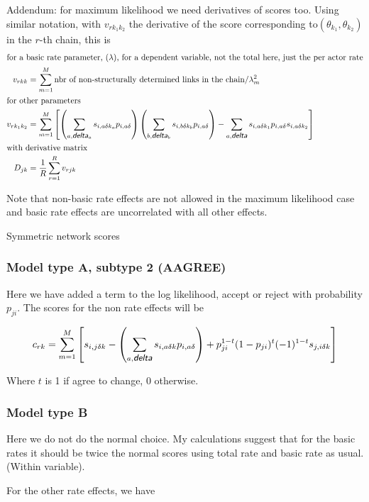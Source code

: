 \documentclass[12pt,a4paper]{article}
\makeatletter
\renewcommand{\=}{\,=\,}
\newcommand{\+}{\,+\,}
\newcommand{\nnm}[1]{\textsf{\small\textit{#1}}}
\renewcommand{\subsection}{\@startsection{subsection}{2}
                {0pt}{0.7\baselineskip}{0.3\baselineskip}
                {\sffamily} }
\makeatother
\begin{document}
Addendum: for maximum likelihood we need derivatives of scores too. Using
similar notation, with $v_{rk_1k_2}$ the derivative of the score corresponding
to$(\theta_{k_1}, \theta_{k_2})$  in the $r$-th chain,  this is
\begin{align*}
\intertext{for a basic rate parameter, $(\lambda)$, for a
dependent variable, not the total here, just the per actor rate}
v_{rkk} &= \sum_{m=1}^M  \textrm{nbr of non-structurally determined links in the
  chain}/ \lambda_m^2\\
\intertext{for other parameters}
v_{rk_1k_2}&= \sum_{m=1}^M \left [  \left( \sum_{a, \nnm{delta}_a}
  s_{i,a\delta k_a} p_{i,a\delta} \right) \left (
\sum_{ b, \nnm{delta}_b} s_{i,b\delta k_b} p_{i,a\delta} \right) -
\sum_{a, \nnm{delta}}
  s_{i,a\delta k_1}p_{i,a\delta}  s_{i,a\delta k_2}
\right ]\\
\intertext{with derivative matrix}
 D_{jk}&=\frac{1}{R}\sum_{r=1}^R v_{rjk}
\end{align*}

Note that non-basic rate effects are not allowed in the maximum likelihood
case and basic rate effects are uncorrelated with all other effects.

\subsection{Symmetric network scores}
\label{sec:symScores}
\subsubsection{Model type A, subtype 2 (AAGREE)}
Here we have added a term to the log likelihood, accept or reject with
probability $p_{ji}$.
The scores for the non rate effects will be

$$c_{rk}= \sum_{m=1}^M \left [ s_{i,j\delta k}- \left(\sum_{a,\nnm{delta}}
  s_{i,a\delta k}p_{i,a\delta}\right) +
p_{ji}^{1-t} (1-p_{ji})^t (-1)^{1-t}s_{j,i\delta
  k}\right]$$

Where $t$ is 1 if agree to change, 0 otherwise.
\subsubsection{Model type B}
Here we do not do the normal choice. My calculations suggest that for the basic
rates it should be twice the normal scores using total rate and basic rate as
usual. (Within variable).

For the other rate effects, we have
\end{document}
